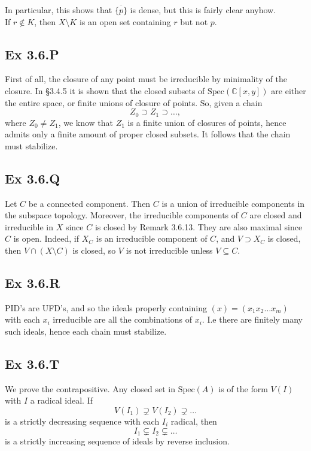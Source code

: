\documentclass{article}
\theoremstyle{definition}
\newcommand{\C}{\mathbb{C}}
\newcommand{\Spec}{\text{Spec}}
\begin{document}
In particular, this shows that $\overline{\{p\}}$ is dense, but this is fairly
clear anyhow. \\

If $r \not \in K$, then $X \setminus K$ is an open set containing $r$ but not
$p$.

\subsection*{Ex 3.6.P}

First of all, the closure of any point must be irreducible by minimality of the
closure. In §3.4.5 it is shown that the closed subsets of $\Spec(\C[x, y])$ are
either the entire space, or finite unions of closure of points. So, given a chain
\[
	Z_0 \supset Z_1 \supset \ldots,
\]
where $Z_0 \not = Z_1$, we know that $Z_1$ is a finite union of closures of
points, hence admits only a finite amount of proper closed subsets. It follows
that the chain must stabilize.

\subsection*{Ex 3.6.Q}

Let $C$ be a connected component. Then $C$ is a union of irreducible components
in the subspace topology. Moreover, the irreducible components of $C$ are
closed and irreducible in $X$ since $C$ is closed by Remark 3.6.13. They are
also maximal since $C$ is open. Indeed, if $X_C$ is an irreducible component of
$C$, and $V \supset X_C$ is closed, then $V \cap (X \setminus C)$ is closed, so
$V$ is not irreducible unless $V \subseteq C$.

\subsection*{Ex 3.6.R}

PID's are UFD's, and so the ideals properly containing $(x) = (x_1x_2\ldots
	x_m)$ with each $x_i$ irreducible are all the combinations of $x_i$. I.e there
are finitely many such ideals, hence each chain must stabilize.

\subsection*{Ex 3.6.T}

We prove the contrapositive. Any closed set in $\Spec(A)$ is of the form $V(I)$
with $I$ a radical ideal. If
\[
	V(I_1) \supsetneq V(I_2) \supsetneq \ldots
\]
is a strictly decreasing sequence with each $I_i$ radical, then
\[
	I_1 \subsetneq I_2 \subsetneq \ldots
\]
is a strictly increasing sequence of ideals by reverse inclusion. \\
\end{document}
